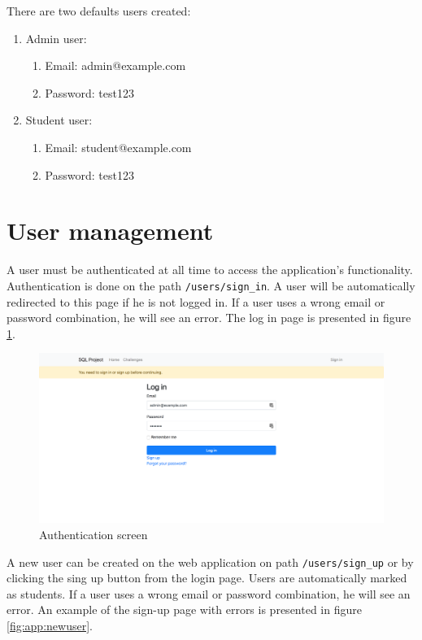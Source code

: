 There are two defaults users created:
\begin{enumerate}
    \item Admin user:
    \begin{enumerate}
        \item Email: admin@example.com
        \item Password: test123
    \end{enumerate}
    \item Student user:
    \begin{enumerate}
        \item Email: student@example.com
        \item Password: test123
    \end{enumerate}
\end{enumerate}

\section{User management}
A user must be authenticated at all time to access the application's functionality. Authentication is done on the path \texttt{/users/sign\_in}. A user will be automatically redirected to this page if he is not logged in. If a user uses a wrong email or password combination, he will see an error. The log in page is presented in figure \ref{fig:app:authentication}.

\begin{figure}[ht]
    \centering
    \includegraphics[width=\textwidth/4*3]{Appendices/authentication.png}
    \caption{Authentication screen}
    \label{fig:app:authentication}
\end{figure}

A new user can be created on the web application on path \texttt{/users/sign\_up} or by clicking the sing up button from the login page. Users are automatically marked as students. If a user uses a wrong email or password combination, he will see an error. An example of the sign-up page with errors is presented in figure \ref{fig:app:newuser}.

